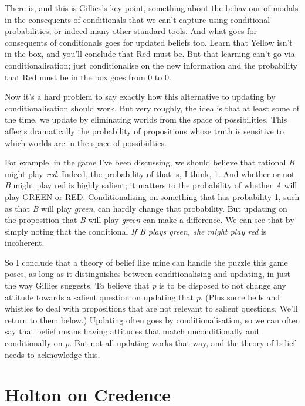 There is, and this is Gillies's key point, something about the behaviour of modals in the consequents of conditionals that we can't capture using conditional probabilities, or indeed many other standard tools. And what goes for consequents of conditionals goes for updated beliefs too. Learn that Yellow isn't in the box, and you'll conclude that Red must be. But that learning can't go via conditionalisation; just conditionalise on the new information and the probability that Red must be in the box goes from 0 to 0.

Now it's a hard problem to say exactly how this alternative to updating by conditionalisation should work. But very roughly, the idea is that at least some of the time, we update by eliminating worlds from the space of possibilities. This affects dramatically the probability of propositions whose truth is sensitive to which worlds are in the space of possibiilties.

For example, in the game I've been discussing, we should believe that rational \textit{B} might play \textit{red}. Indeed, the probability of that is, I think, 1. And whether or not \textit{B} might play red is highly salient; it matters to the probability of whether \textit{A} will play GREEN or RED. Conditionalising on something that has probability 1, such as that \textit{B} will play \textit{green}, can hardly change that probability. But updating on the proposition that \textit{B} will play \textit{green} can make a difference. We can see that by simply noting that the conditional \textit{If B plays green, she might play red} is incoherent.

So I conclude that a theory of belief like mine can handle the puzzle this game poses, as long as it distinguishes between conditionalising and updating, in just the way Gillies suggests. To believe that \textit{p} is to be disposed to not change any attitude towards a salient question on updating that \textit{p}. (Plus some bells and whistles to deal with propositions that are not relevant to salient questions. We'll return to them below.) Updating often goes by conditionalisation, so we can often say that belief means having attitudes that match unconditionally and conditionally on \textit{p}. But not all updating works that way, and the theory of belief needs to acknowledge this.

\section{Holton on Credence}

